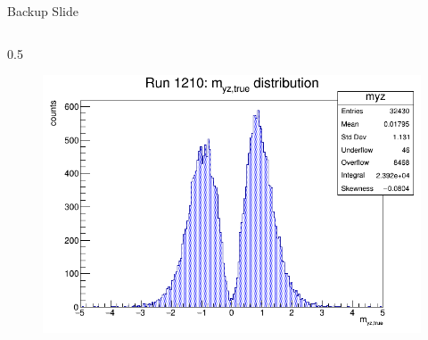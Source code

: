 \documentclass{beamer}[10pt]
\begin{document}
  \begin{frame}{Backup Slide}
    \vspace{-3mm}

    \begin{columns}
      \begin{column}{0.5\framewidth}
    \begin{figure}[H]
      \centering
      \includegraphics[width= \textwidth]{figures/pdf/myz.png}
      \label{fig:enter-label}
  \end{figure}
  \vspace{-12mm}


\end{column}
\end{columns}
\end{frame}
\end{document}
